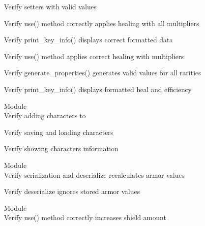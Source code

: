 \begin{DoxyRefList}
\label{test__test000014}%
%
Verify setters with valid values  



\label{test__test000016}%
%
Verify use() method correctly applies healing with all multipliers  



\label{test__test000017}%
%
Verify print\+\_\+key\+\_\+info() displays correct formatted data  



\label{test__test000018}%
%
Verify use() method applies correct healing with multipliers  



\label{test__test000019}%
%
Verify generate\+\_\+properties() generates valid values for all rarities  



\label{test__test000020}%
%
Verify print\+\_\+key\+\_\+info() displays formatted heal and efficiency  


\item[Module \doxylink{group___human_player}{Human\+Player} ]\hfill \\
\label{test__test000122}%
%
Verify adding characters to   



\label{test__test000123}%
%
Verify saving and loading characters  



\label{test__test000124}%
%
Verify showing characters information  


\item[Module \doxylink{group___knight_character}{Knight\+Character} ]\hfill \\
\label{test__test000109}%
%
Verify serialization and deserialize recalculates armor values  



\label{test__test000110}%
%
Verify deserialize ignores stored armor values  


\item[Module \doxylink{group___shield_card}{Shield\+Card} ]\hfill \\
\label{test__test000050}%
%
Verify use() method correctly increases shield amount  




\end{DoxyRefList}

